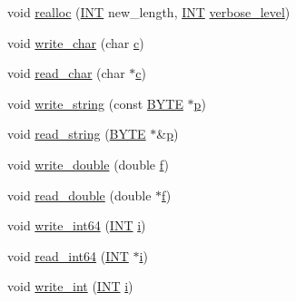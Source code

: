 \begin{DoxyCompactItemize}
\item 
void \mbox{\hyperlink{classmemory__object_a29ea5862bdfae31e11a5c1ccc121b594}{realloc}} (\mbox{\hyperlink{galois_8h_a09fddde158a3a20bd2dcadb609de11dc}{I\+NT}} new\+\_\+length, \mbox{\hyperlink{galois_8h_a09fddde158a3a20bd2dcadb609de11dc}{I\+NT}} \mbox{\hyperlink{simeon_8_c_a818073fbcc2f439e7c56952f67386122}{verbose\+\_\+level}})
\item 
void \mbox{\hyperlink{classmemory__object_a1b2aafe9f159e3ca6384b7a8db0cc7cf}{write\+\_\+char}} (char \mbox{\hyperlink{alphabet2_8_c_a4e1e0e72dd773439e333c84dd762a9c3}{c}})
\item 
void \mbox{\hyperlink{classmemory__object_ad45168f1726af96cdbe0770c07cd6e23}{read\+\_\+char}} (char $\ast$\mbox{\hyperlink{alphabet2_8_c_a4e1e0e72dd773439e333c84dd762a9c3}{c}})
\item 
void \mbox{\hyperlink{classmemory__object_ae4bf39b14c242094cc6f281c00aea9bc}{write\+\_\+string}} (const \mbox{\hyperlink{galois_8h_ab6cc7b4aeb6ea31aba2b3fbfc83ff5e6}{B\+Y\+TE}} $\ast$\mbox{\hyperlink{alphabet2_8_c_a533391314665d6bf1b5575e9a9cd8552}{p}})
\item 
void \mbox{\hyperlink{classmemory__object_a0810257f34c8323453af7bf783511ed1}{read\+\_\+string}} (\mbox{\hyperlink{galois_8h_ab6cc7b4aeb6ea31aba2b3fbfc83ff5e6}{B\+Y\+TE}} $\ast$\&\mbox{\hyperlink{alphabet2_8_c_a533391314665d6bf1b5575e9a9cd8552}{p}})
\item 
void \mbox{\hyperlink{classmemory__object_a05ab03814bd373ee3edd0d897b437873}{write\+\_\+double}} (double \mbox{\hyperlink{alphabet2_8_c_a362077c979b0bb65159c603270e40f70}{f}})
\item 
void \mbox{\hyperlink{classmemory__object_ae3350c7b5063f2a384ca1de02f63bc7c}{read\+\_\+double}} (double $\ast$\mbox{\hyperlink{alphabet2_8_c_a362077c979b0bb65159c603270e40f70}{f}})
\item 
void \mbox{\hyperlink{classmemory__object_aace89309983982f60d83562b1a19401b}{write\+\_\+int64}} (\mbox{\hyperlink{galois_8h_a09fddde158a3a20bd2dcadb609de11dc}{I\+NT}} \mbox{\hyperlink{alphabet2_8_c_acb559820d9ca11295b4500f179ef6392}{i}})
\item 
void \mbox{\hyperlink{classmemory__object_a87244ab7abe1740f52575bc0e1760e93}{read\+\_\+int64}} (\mbox{\hyperlink{galois_8h_a09fddde158a3a20bd2dcadb609de11dc}{I\+NT}} $\ast$\mbox{\hyperlink{alphabet2_8_c_acb559820d9ca11295b4500f179ef6392}{i}})
\item 
void \mbox{\hyperlink{classmemory__object_ac64fbf0d109921cda07123999b0ac486}{write\+\_\+int}} (\mbox{\hyperlink{galois_8h_a09fddde158a3a20bd2dcadb609de11dc}{I\+NT}} \mbox{\hyperlink{alphabet2_8_c_acb559820d9ca11295b4500f179ef6392}{i}})

\end{DoxyCompactItemize}
